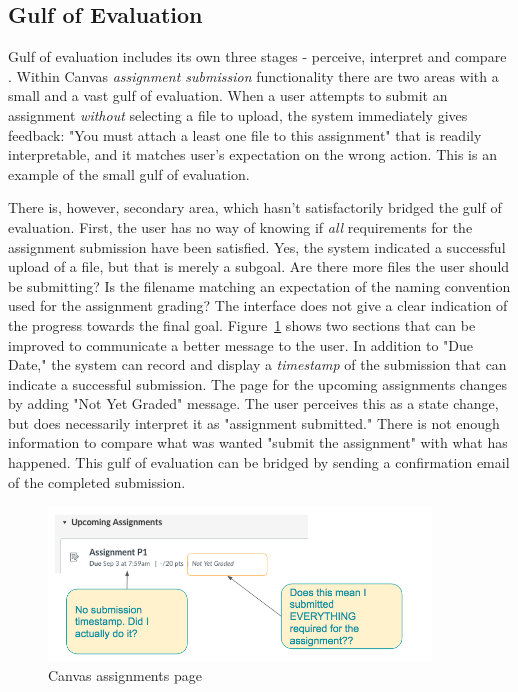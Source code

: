 \documentclass[12pt,letterpaper]{article}
\begin{document}
\subsection*{Gulf of Evaluation}
Gulf of evaluation includes its own three stages - perceive, interpret and compare \cite{norman2013design}. Within Canvas \textit{assignment submission} functionality there are two areas with a small and a vast gulf of evaluation. When a user attempts to submit an assignment \textit{without} selecting a file to upload, the system immediately gives feedback: "You must attach a least one file to this assignment" that is readily interpretable, and it matches user's expectation on the wrong action. This is an example of the small gulf of evaluation.

There is, however, secondary area, which hasn't satisfactorily bridged the gulf of evaluation. First, the user has no way of knowing if \textit{all} requirements for the assignment submission have been satisfied. Yes, the system indicated a successful upload of a file, but that is merely a subgoal. Are there more files the user should be submitting? Is the filename matching an expectation of the naming convention used for the assignment grading? The interface does not give a clear indication of the progress towards the final goal. Figure~\ref{fig::4} shows two sections that can be improved to communicate a better message to the user. In addition to "Due Date," the system can record and display a \textit{timestamp} of the submission that can indicate a successful submission. The page for the upcoming assignments changes by adding "Not Yet Graded" message. The user perceives this as a state change, but does necessarily interpret it as "assignment submitted." There is not enough information to compare what was wanted "submit the assignment" with what has happened. This gulf of evaluation can be bridged by sending a confirmation email of the completed submission.

\begin{figure}[H]
\centering
\includegraphics[width=4in, scale=.4]{canvas.png}
\caption{Canvas assignments page}
\label{fig::4}
\end{figure}
\end{document}
